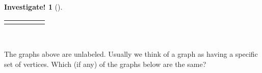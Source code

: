 \documentclass[12pt,]{book}
\theoremstyle{plain}
\theoremstyle{definition}
\theoremstyle{definition}
\theoremstyle{definition}
\newtheorem{investigation}[project]{Investigate!}
\numberwithin{equation}{chapter}
\newlength{\panelmax}
\newcommand{\vtx}[2]{node[fill,circle,inner sep=0pt, minimum size=4pt,label=#1:#2]{}}
\renewcommand{\v}{\vtx{above}{}}
\begin{document}
\begin{investigation}[]
{\begin{lrbox}{\panelboxEimage}
{{
}
}\end{lrbox}
\ifdefined\phEimage\else\newlength{\phEimage}\fi%
\setlength{\phEimage}{\ht\panelboxEimage+\dp\panelboxEimage}
\settototalheight{\phEimage}{\usebox{\panelboxEimage}}
\setlength{\panelmax}{\maxof{\panelmax}{\phEimage}}
\leavevmode%
\setlength{\tabcolsep}{0.01\linewidth}
\par\medskip\noindent
\hspace*{0.01\linewidth}%
\begin{tabular}{@{}*{5}{c}@{}}
\begin{minipage}[c][\panelmax][b]{0.18\linewidth}\usebox{\panelboxAimage}\end{minipage}&
\begin{minipage}[c][\panelmax][b]{0.18\linewidth}\usebox{\panelboxBimage}\end{minipage}&
\begin{minipage}[c][\panelmax][b]{0.18\linewidth}\usebox{\panelboxCimage}\end{minipage}&
\begin{minipage}[c][\panelmax][b]{0.18\linewidth}\usebox{\panelboxDimage}\end{minipage}&
\begin{minipage}[c][\panelmax][b]{0.18\linewidth}\usebox{\panelboxEimage}\end{minipage}\end{tabular}\\
}%
\par
\hypertarget{p-1502}{}%
The graphs above are unlabeled. Usually we think of a graph as having a specific set of vertices. Which (if any) of the graphs below are the same?%
{%
\setlength{\panelmax}{0pt}
\ifdefined\panelboxAimage\else\newsavebox{\panelboxAimage}\fi%
\begin{lrbox}{\panelboxAimage}
\end{lrbox}}
\end{investigation}
\end{document}
